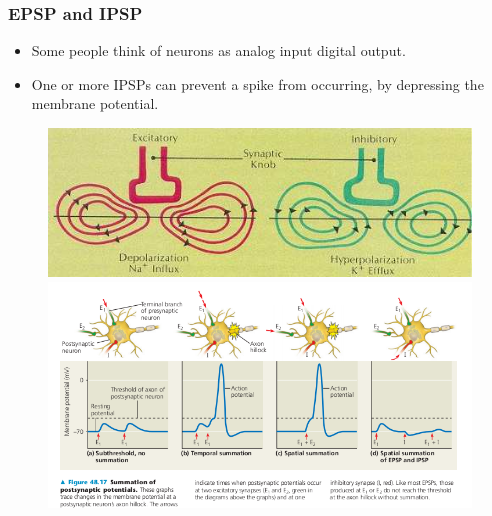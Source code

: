 \documentclass{beamer}
\begin{document}
\begin{frame}
\frametitle{EPSP and IPSP}
\begin{itemize}

\item \vfill Some people think of neurons as analog input digital output. %
\vfill

\item \vfill One or more IPSPs can prevent a spike from occurring, by depressing the membrane potential.

\end{itemize}

\begin{figure}
\begin{minipage}{0.45\linewidth}
\centering
\includegraphics[scale=0.32]{epsp1a.jpg} 
\end{minipage}

\begin{minipage}{0.45\linewidth}
\includegraphics[scale=0.32,center]{IPSPepsp.png}

\end{minipage}
\end{figure}



\end{frame}
\end{document}

